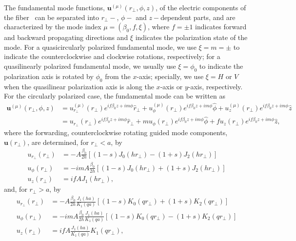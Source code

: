 \documentclass[preprint,aps,pra,onecolumn]{revtex4-1} %
\begin{document}
The fundamental mode functions, $\mathbf{u}^{(\mu)}(r\!_\perp,\phi,z)$, of the electric components of the fiber~\cite{LeKien2005,Lacroute2012} can be separated into $r\!_\perp-$, $\phi-$ and $z-$dependent parts, and are characterized by the mode index $\mu=(\beta_0,f,\xi)$, where $f=\pm 1$ indicates forward and backward propagating directions and $\xi $ indicates the polarization state of the mode. For a quasicircularly polarized fundamental mode, we use $\xi=m=\pm $ to indicate the counterclockwise and clockwise rotations, respectively; for a quasilinearly polarized fundamental mode, we usually use $\xi=\phi_0$ to indicate the polarization axis is rotated by $\phi_0$ from the $x$-axis; specially, we use $\xi=H$ or $V$ when the quasilinear polarization axis is along the $x$-axis or $y$-axis, respectively. For the circularly polarized case, the fundamental mode can be written as 
\begin{align}
\mathbf{u}^{(\mu)}(r\!_\perp,\phi,z) &=u^{(\mu)}_{r\!_\perp}(r\!_\perp) e^{if\beta_0 z+im\phi }\hat{r}\!_\perp +u^{(\mu)}_{\phi}(r\!_\perp) e^{if\beta_0 z+im\phi } \hat{\phi} +u^{(\mu)}_{z}(r\!_\perp)e^{if\beta_0 z+im\phi }\hat{z}\\
&=u_{r\!_\perp}(r\!_\perp) e^{if\beta_0 z+im\phi }\hat{r}\!_\perp + m u_{\phi}(r\!_\perp) e^{if\beta_0 z+im\phi }\hat{\phi} + f u_z (r\!_\perp) e^{if\beta_0 z+im\phi }\hat{z},
\end{align}
where the forwarding, counterclockwise rotating guided mode components, $\mathbf{u}(r\!_\perp)$, are determined, for $r\!_\perp<a$, by
\begin{subequations}
\label{urtcrla}
\begin{align}
u_{r\!_\perp}(r\!_\perp) &=-A\frac{\beta_0}{2h} \left[ (1-s)J_0(hr\!_\perp)-(1+s)J_2(hr\!_\perp) \right]\\
u_\phi(r\!_\perp) &=  -imA \frac{\beta_0}{2h} \left[ (1-s)J_0(hr\!_\perp) +(1+s)J_2(hr\!_\perp) \right] \\
u_z(r\!_\perp) &= ifA J_1(hr\!_\perp),
\end{align}
\end{subequations}
and, for $ r_\perp>a $, by
\begin{subequations}
\label{urtcrga}
\begin{align}
u_{r\!_\perp}(r\!_\perp) &=-A\frac{\beta_0}{2h}\frac{J_1(ha)}{K_1(qa)} \left[ (1-s)K_0(qr\!_\perp)+(1+s)K_2(qr\!_\perp) \right]\\
u_\phi(r\!_\perp) &=  -imA \frac{\beta_0}{2h} \frac{J_1(ha)}{K_1(qa)} \left[ (1-s)K_0(qr\!_\perp) - (1+s)K_2(qr\!_\perp) \right] \\
u_z(r\!_\perp) &= ifA \frac{J_1(ha)}{K_1(qa)} K_1(qr\!_\perp),
\end{align}
\end{subequations}
\end{document}
